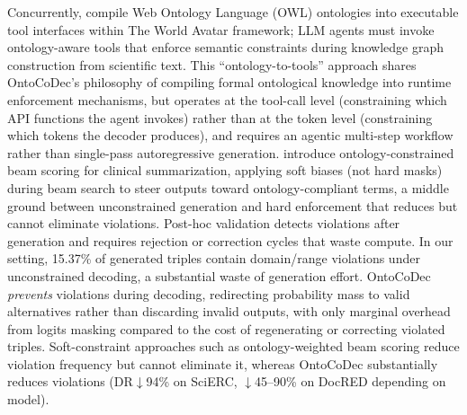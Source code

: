Concurrently, \citet{zhou2026ontologytools} compile Web Ontology Language (OWL) ontologies into executable tool interfaces within The World Avatar framework; LLM agents must invoke ontology-aware tools that enforce semantic constraints during knowledge graph construction from scientific text.
This ``ontology-to-tools'' approach shares OntoCoDec's philosophy of compiling formal ontological knowledge into runtime enforcement mechanisms, but operates at the tool-call level (constraining which API functions the agent invokes) rather than at the token level (constraining which tokens the decoder produces), and requires an agentic multi-step workflow rather than single-pass autoregressive generation.
\citet{ekaw2024_ontology_beam} introduce ontology-constrained beam scoring for clinical summarization, applying soft biases (not hard masks) during beam search to steer outputs toward ontology-compliant terms, a middle ground between unconstrained generation and hard enforcement that reduces but cannot eliminate violations.
Post-hoc validation detects violations after generation and requires rejection or correction cycles that waste compute. In our setting, 15.37\% of generated triples contain domain/range violations under unconstrained decoding, a substantial waste of generation effort.
OntoCoDec \emph{prevents} violations during decoding, redirecting probability mass to valid alternatives rather than discarding invalid outputs, with only marginal overhead from logits masking compared to the cost of regenerating or correcting violated triples.
Soft-constraint approaches such as ontology-weighted beam scoring reduce violation frequency but cannot eliminate it, whereas OntoCoDec substantially reduces violations (DR$\downarrow$94\% on SciERC, $\downarrow$45--90\% on DocRED depending on model).

